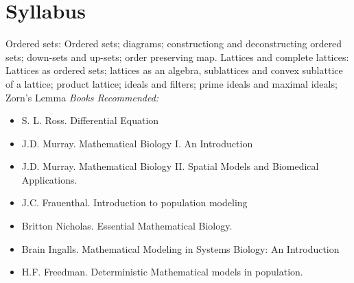 \documentclass[../main-sheet.tex]{subfiles}
\begin{document}
\chapter*{Syllabus}
Ordered sets: Ordered sets; diagrams; constructiong and deconstructing ordered sets; down-sets and up-sets; order preserving map. Lattices and complete lattices: Lattices as ordered sets; lattices as an algebra, sublattices and convex sublattice of a lattice; product lattice; ideals and filters; prime ideals and maximal ideals; Zorn's Lemma
\emph{Books Recommended:}
\begin{itemize}
    \item S. L. Ross. Differential Equation
    \item J.D. Murray. Mathematical Biology I. An Introduction
    \item J.D. Murray. Mathematical Biology II. Spatial Models and Biomedical Applications.
    \item J.C. Frauenthal. Introduction to population modeling
    \item Britton Nicholas. Essential Mathematical Biology.
    \item Brain Ingalls. Mathematical Modeling in Systems Biology: An Introduction
    \item H.F. Freedman. Deterministic Mathematical models in population.
\end{itemize}
\end{document}
